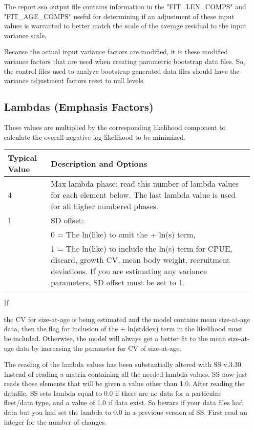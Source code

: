 The report.sso output file contains information in the "FIT\_LEN\_COMPS" and "FIT\_AGE\_COMPS"  useful for determining if an adjustment of these input values is warranted to better match the scale of the average residual to the input variance scale.
	
Because the actual input variance factors are modified, it is these modified variance factors that are used when creating parametric bootstrap data files. So, the control files used to analyze bootstrap generated data files should have the variance adjustment factors reset to null levels.


\hypertarget{Lambdas}{}
\subsection{Lambdas (Emphasis Factors)}
These values are multiplied by the corresponding likelihood component to calculate the overall negative log likelihood to be minimized.


\begin{tabular}{p{3cm} p{13cm}}
	\hline
	Typical Value & Description and Options\Tstrut\Bstrut\\
	\hline
	4 \Tstrut & Max lambda phase: read this number of lambda values for each element below.  The last lambda value is used for all higher numbered phases.\Bstrut\\
	1 & SD offset: \\
	  & 0 = The ln(like) to omit the + ln(s) term,\\
	  & 1 = The ln(like) to include the ln(s) term for CPUE, discard, growth CV, mean body weight, recruitment deviations. If you are estimating any variance parameters, SD offset must be set to 1.  \Bstrut\\
	\hline
\end{tabular}


\hypertarget{SaAlambda}{If} the CV for size-at-age is being estimated and the model contains mean size-at-age data, then the flag for inclusion of the + ln(stddev) term in the likelihood must be included. Otherwise, the model will always get a better fit to the mean size-at-age data by increasing the parameter for CV of size-at-age.

The reading of the lambda values has been substantially altered with SS v.3.30. Instead of reading a matrix containing all the needed lambda values, SS now just reads those elements that will be given a value other than 1.0.  After reading the datafile, SS sets lambda equal to 0.0 if there are no data for a particular fleet/data type, and a value of 1.0 if data exist. So beware if your data files had data but you had set the lambda to 0.0 in a previous version of SS.  First read an integer for the number of changes.


